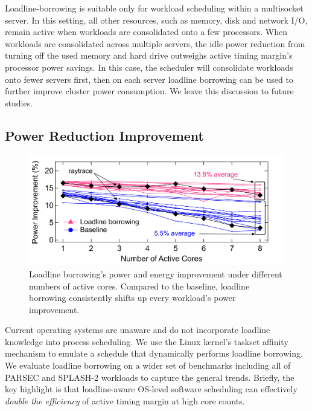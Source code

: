 Loadline-borrowing is suitable only for workload scheduling within a multisocket server. In this setting, all other resources, such as memory, disk and network I/O, remain active when workloads are consolidated onto a few processors. When workloads are consolidated across multiple servers, the idle power reduction from turning off the used memory and hard drive outweighs active timing margin's processor power savings. In this case, the scheduler will consolidate workloads onto fewer servers first, then on each server loadline borrowing can be used to further improve cluster power consumption. We leave this discussion to future studies.

\subsection{Power Reduction Improvement}
\label{sec:voltage:opt:result}

\begin{figure}[t]
\centering
    \includegraphics[trim=0 0 0 0, clip,width=0.8\linewidth]{graphs/voltage/loadline-borrowing_scale.pdf}
    \caption{Loadline borrowing's power and energy improvement under different numbers of active cores. Compared to the baseline, loadline borrowing consistently shifts up every workload's power improvement.}
    \label{fig:ll-borrow-scale}
    \vspace{-0.2cm}
\end{figure}

Current operating systems are unaware and do not incorporate loadline knowledge into process scheduling. We use the Linux kernel's taskset affinity mechanism to emulate a schedule that dynamically performs loadline borrowing. We evaluate loadline borrowing on a wider set of benchmarks including all of PARSEC and SPLASH-2 workloads to capture the general trends. Briefly, the key highlight is that loadline-aware OS-level software scheduling can effectively \emph{double the efficiency} of active timing margin at high core counts.

